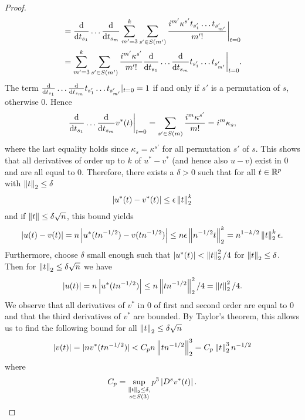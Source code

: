 \begin{proof}
\begin{align*}
        &= \frac{\text{d}}{\text{d} t_{s_1}}\ldots\frac{\text{d}}{\text{d} t_{s_m}} \sum_{m'=3}^k \sum_{s' \in S(m')} \frac{i^{m'}\kappa^{s'}t_{s'_1}\ldots t_{s'_{m'}}}{m'!} \bigg|_{t=0} \\
        &= \sum_{m'=3}^k \sum_{s' \in S(m')} \frac{i^{m'}\kappa^{s'}}{m'!} \frac{\text{d}}{\text{d} t_{s_1}}\ldots\frac{\text{d}}{\text{d} t_{s_m}}t_{s'_1}\ldots t_{s'_{m'}} \bigg|_{t=0}.
    \end{align*}
    The term $\frac{\text{d}}{\text{d} t_{s_1}}\ldots\frac{\text{d}}{\text{d} t_{s_m}}t_{s'_1}\ldots t_{s'_{m'}} |_{t=0} = 1$ if and only if $s'$ is a permutation of $s$, otherwise 0. Hence
    \begin{equation*}
        \frac{\text{d}}{\text{d} t_{s_1}}\ldots\frac{\text{d}}{\text{d} t_{s_m}} v^*(t) \bigg|_{t=0} 
        = \sum_{s' \in S(m)} \frac{i^m\kappa^{s'}}{m!}
        = i^m\kappa_s,
    \end{equation*}
    where the last equality holds since $\kappa_s = \kappa^{s'}$ for all permutation $s'$ of $s$. 
    This shows that all derivatives of order up to $k$ of $u^* - v^*$ (and hence also $u - v$) exist in 0 and are all equal to 0. Therefore, there exists a $\delta > 0$ such that for all $t \in {\mathbb{R}^p}$ with $\left\lVert t\right\rVert_2 \leq \delta$
    \begin{equation*}
        \left|u^*(t) - v^*(t)\right| \leq \epsilon\left\lVert t\right\rVert_2^k
    \end{equation*}
    and if $\left\lVert t\right\rVert \leq \delta \sqrt{n}$, this bound yields
    \begin{equation*}
        \left|u(t) - v(t)\right| = n\left|u^*(t n^{-1/2}) - v(t n^{-1/2})\right| \leq n\epsilon\left\lVert n^{-1/2}t\right\rVert_2^k = n^{1-k/2}\left\lVert t\right\rVert_2^k\epsilon.
    \end{equation*}
    Furthermore, choose $\delta$ small enough such that $\left|u^*(t)\right| < \left\lVert t\right\rVert_2^2/4$ for $\left\lVert t\right\rVert_2 \leq \delta$. Then for $\left\lVert t\right\rVert_2 \leq \delta\sqrt{n}$ we have
    \begin{equation*}
        \left|u(t)\right| = n\left|u^*(t n^{-1/2})\right| \leq n \left\lVert t n^{-1/2}\right\rVert_2^2/4 = \left\lVert t\right\rVert_2^2/4.
    \end{equation*}
    We observe that all derivatives of $v^*$ in 0 of first and second order are equal to 0 and that the third derivatives of $v^*$ are bounded. By Taylor's theorem, this allows us to find the following bound for all $\left\lVert t\right\rVert_2 \leq \delta \sqrt{n}$
    \begin{equation*}
        |v(t)| = |nv^*(t n^{-1/2})| < C_p n \left\lVert t n^{-1/2}\right\rVert_2^3 = C_p \left\lVert t\right\rVert_2^3 n^{-1/2}
    \end{equation*}
    where
    \begin{equation*}
        C_p = \sup_{\substack{\norm{t}_2 \leq \delta, \\ s \in S(3)}} p^3\abs{ D^sv^*(t) }.

\end{equation*}
\end{proof}
